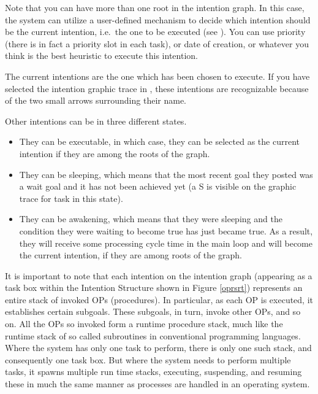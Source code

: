 Note that you can have more than one root in the intention graph. In this
case, the system can utilize a user-defined mechanism to decide which
intention should be the current intention, i.e.\ the one to be executed
(see ). You can use priority
(there is in fact a priority slot in each task), or date of creation, or
whatever you think is the best heuristic to execute this intention.

The current intentions are the one which has been chosen to execute. If
you have selected the intention graphic trace in \XPK{}, these intentions
are recognizable because of the two small arrows surrounding their name.

Other intentions can be in three different states.

\begin{itemize}

\item They can be executable, in which case, they can be selected as the
current intention if they are among the roots of the graph.

\item They can be sleeping, which means that the most recent goal they
posted was a wait goal and it has not been achieved yet (a S is visible on
the graphic trace for task in this state).


\item They can be awakening, which means that they were sleeping and the
condition they were waiting to become true has just became true. As a result, they will 
receive some processing cycle time in the main loop and will become the current
intention, if they are among roots of the graph.

\end{itemize}

It is important to note that each intention on the intention graph
(appearing as a task box within the Intention Structure shown in Figure
\ref{oprsrt}) represents an entire stack of invoked OPs (procedures).  In
particular, as each OP is executed, it establishes certain subgoals.
These subgoals, in turn, invoke other OPs, and so on.  All the OPs so
invoked form a runtime procedure stack, much like the runtime stack of so
called subroutines in conventional programming languages.  Where the
system has only one task to perform, there is only one such stack, and
consequently one task box.  But where the system needs to perform multiple
tasks, it spawns multiple run time stacks, executing, suspending, and
resuming these in much the same manner as processes are handled in an
operating system.

